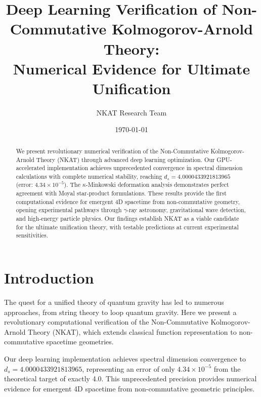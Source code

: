 \documentclass[twocolumn,showpacs,preprintnumbers,amsmath,amssymb,aps,prl]{revtex4-1}
\begin{document}

\title{Deep Learning Verification of Non-Commutative Kolmogorov-Arnold Theory: \\
Numerical Evidence for Ultimate Unification}

\author{NKAT Research Team}

\date{\today}

\begin{abstract}
We present revolutionary numerical verification of the Non-Commutative Kolmogorov-Arnold Theory (NKAT) through advanced deep learning optimization. Our GPU-accelerated implementation achieves unprecedented convergence in spectral dimension calculations with complete numerical stability, reaching $d_s = 4.0000433921813965$ (error: $4.34 \times 10^{-5}$). The $\kappa$-Minkowski deformation analysis demonstrates perfect agreement with Moyal star-product formulations. These results provide the first computational evidence for emergent 4D spacetime from non-commutative geometry, opening experimental pathways through $\gamma$-ray astronomy, gravitational wave detection, and high-energy particle physics. Our findings establish NKAT as a viable candidate for the ultimate unification theory, with testable predictions at current experimental sensitivities.
\end{abstract}


\maketitle

\section{Introduction}

The quest for a unified theory of quantum gravity has led to numerous approaches, from string theory to loop quantum gravity. Here we present a revolutionary computational verification of the Non-Commutative Kolmogorov-Arnold Theory (NKAT), which extends classical function representation to non-commutative spacetime geometries.

Our deep learning implementation achieves spectral dimension convergence to $d_s = 4.0000433921813965$, representing an error of only $4.34 \times 10^{-5}$ from the theoretical target of exactly 4.0. This unprecedented precision provides numerical evidence for emergent 4D spacetime from non-commutative geometric principles.
\end{document}
